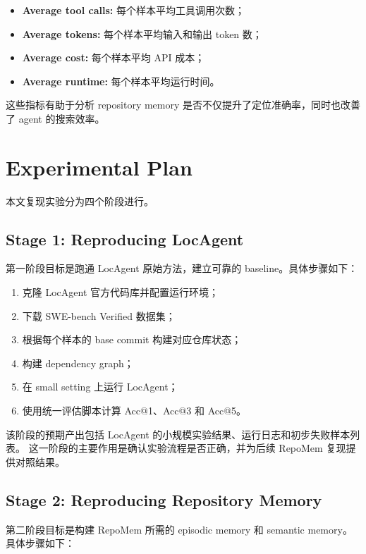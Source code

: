 \documentclass[11pt]{article}
\begin{document}
\begin{itemize}
    \item \textbf{Average tool calls:} 每个样本平均工具调用次数；
    \item \textbf{Average tokens:} 每个样本平均输入和输出 token 数；
    \item \textbf{Average cost:} 每个样本平均 API 成本；
    \item \textbf{Average runtime:} 每个样本平均运行时间。
\end{itemize}

这些指标有助于分析 repository memory 是否不仅提升了定位准确率，同时也改善了 agent 的搜索效率。

\section{Experimental Plan}
\label{sec:experimental_plan}

本文复现实验分为四个阶段进行。

\subsection{Stage 1: Reproducing LocAgent}
\label{subsec:stage1}

第一阶段目标是跑通 LocAgent 原始方法，建立可靠的 baseline。具体步骤如下：

\begin{enumerate}
    \item 克隆 LocAgent 官方代码库并配置运行环境；
    \item 下载 SWE-bench Verified 数据集；
    \item 根据每个样本的 base commit 构建对应仓库状态；
    \item 构建 dependency graph；
    \item 在 small setting 上运行 LocAgent；
    \item 使用统一评估脚本计算 Acc@1、Acc@3 和 Acc@5。
\end{enumerate}

该阶段的预期产出包括 LocAgent 的小规模实验结果、运行日志和初步失败样本列表。
这一阶段的主要作用是确认实验流程是否正确，并为后续 RepoMem 复现提供对照结果。

\subsection{Stage 2: Reproducing Repository Memory}
\label{subsec:stage2}

第二阶段目标是构建 RepoMem 所需的 episodic memory 和 semantic memory。
具体步骤如下：
\end{document}

